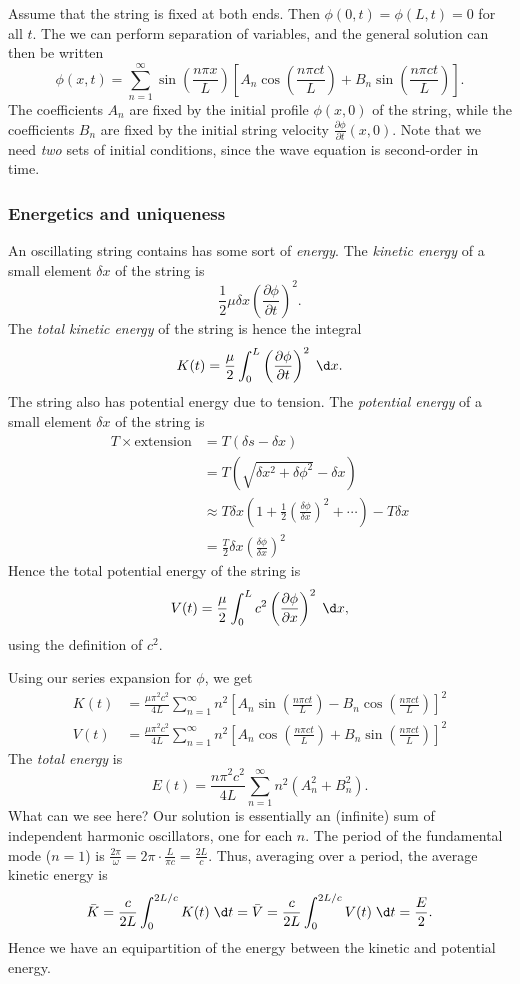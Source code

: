 \documentclass[a4paper]{article}
\begin{document}
Assume that the string is fixed at both ends. Then $\phi(0, t) = \phi(L, t) = 0$ for all $t$. The we can perform separation of variables, and the general solution can then be written
\[
  \phi(x, t) = \sum_{n = 1}^\infty \sin\left(\frac{n \pi x}{L}\right)\left[A_n \cos\left(\frac{n \pi c t}{L}\right) + B_n \sin\left(\frac{n\pi ct}{L}\right)\right].
\]
The coefficients $A_n$ are fixed by the initial profile $\phi(x, 0)$ of the string, while the coefficients $B_n$ are fixed by the initial string velocity $\frac{\partial \phi}{\partial t} (x, 0)$. Note that we need \emph{two} sets of initial conditions, since the wave equation is second-order in time.

\subsubsection*{Energetics and uniqueness}
An oscillating string contains has some sort of \emph{energy}. The \emph{kinetic energy} of a small element $\delta x$ of the string is
\[
  \frac{1}{2}\mu \delta x\left(\frac{\partial \phi}{\partial t}\right)^2.
\]
The \emph{total kinetic energy} of the string is hence the integral
\[
  K(t) = \frac{\mu}{2}\int_0^L \left(\frac{\partial \phi}{\partial t}\right)^2 \;\d x.
\]
The string also has potential energy due to tension. The \emph{potential energy} of a small element $\delta x$ of the string is
\begin{align*}
  T\times \text{extension} &= T(\delta s - \delta x) \\
  &= T(\sqrt{\delta x^2 + \delta \phi^2} - \delta x)\\
  &\approx T\delta x\left(1 + \frac{1}{2}\left(\frac{\delta \phi}{\delta x}\right)^2 + \cdots\right) - T \delta x\\
  &= \frac{T}{2}\delta x \left(\frac{\delta \phi}{\delta x}\right)^2
\end{align*}
Hence the total potential energy of the string is
\[
  V(t) = \frac{\mu}{2}\int_0^L c^2 \left(\frac{\partial \phi}{\partial x}\right)^2 \;\d x,
\]
using the definition of $c^2$.

Using our series expansion for $\phi$, we get
\begin{align*}
  K(t) &= \frac{\mu \pi^2 c^2}{4L}\sum_{n = 1}^\infty n^2 \left[A_n \sin \left(\frac{n\pi c t}{L}\right) - B_n \cos \left(\frac{n\pi ct}{L}\right)\right]^2\\
  V(t) &= \frac{\mu\pi^2 c^2}{4L} \sum_{n = 1}^\infty n^2 \left[A_n \cos\left(\frac{n\pi ct}{L}\right) + B_n \sin\left(\frac{n\pi ct}{L}\right)\right]^2
\end{align*}
The \emph{total energy} is
\[
  E(t) = \frac{n\pi^2 c^2}{4L}\sum_{n = 1}^\infty n^2 (A_n^2 + B_n^2).
\]
What can we see here? Our solution is essentially an (infinite) sum of independent harmonic oscillators, one for each $n$. The period of the fundamental mode ($n = 1$) is $\frac{2\pi}{\omega} = 2\pi \cdot \frac{L}{\pi c} = \frac{2L}{c}$. Thus, averaging over a period, the average kinetic energy is
\[
  \bar K = \frac{c}{2L} \int_0^{2L/c} K(t)\;\d t = \bar V = \frac{c}{2L}\int_0^{2L/c} V(t)\;\d t = \frac{E}{2}.
\]
Hence we have an equipartition of the energy between the kinetic and potential energy.
\end{document}
